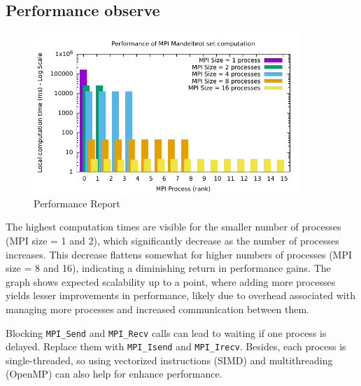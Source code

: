 \documentclass[unicode,11pt,a4paper,oneside,numbers=endperiod,openany]{scrartcl}
\begin{document}
\subsection{Performance observe}
\begin{figure}[h]
    \centering
    \includegraphics[width=0.9\textwidth]{pictures/perf.pdf}
    \caption{Performance Report}
\end{figure}
The highest computation times are visible for the smaller number of processes (MPI size = 1 and 2), which significantly decrease as the number of processes increases. This decrease flattens somewhat for higher numbers of processes (MPI size = 8 and 16), indicating a diminishing return in performance gains. The graph shows expected scalability up to a point, where adding more processes yields lesser improvements in performance, likely due to overhead associated with managing more processes and increased communication between them.


Blocking \texttt{MPI\_Send} and \texttt{MPI\_Recv} calls can lead to waiting if one process is delayed. Replace them with \texttt{MPI\_Isend} and \texttt{MPI\_Irecv}. Besides, each process is single-threaded, so using vectorized instructions (SIMD) and multithreading (OpenMP) can also help for enhance performance.
\end{document}
